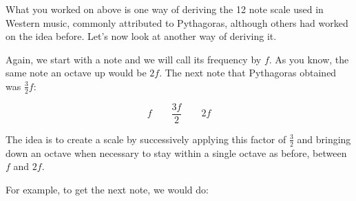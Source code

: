 \documentclass[12pt,noauthor,nooutcomes,hints,instructornotes]{ximera}%
\begin{document}
What you worked on above is one way of deriving the 12 note scale used in Western music, commonly attributed to Pythagoras, although others had worked on the idea before. Let's now look at another way of deriving it.


Again, we start with a note and we will call its frequency by $f$. As you know, the same note an octave up would be $2f$. The next note that Pythagoras obtained was $\frac{3}{2}f$:
    

    

\[ f \qquad \frac{3f}{2} \qquad 2f
\]
    

The idea is to create a scale by successively applying this factor of $\frac{3}{2}$ and bringing down an octave when necessary to stay within a single octave as before, between $f$ and $2f$.

For example, to get the next note, we would do:


\end{document}
